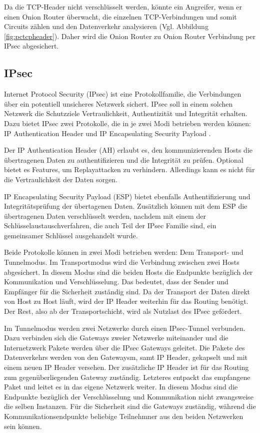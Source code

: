 \documentclass[fleqn,envcountsame,runningheads,10pt,a4paper]{llncs}
\begin{document}
Da die TCP-Header nicht verschlüsselt werden, könnte ein Angreifer, wenn er 
einen Onion Router überwacht, die einzelnen TCP-Ver\-bin\-dung\-en und somit 
Circuits zählen und den Datenverkehr analysieren (Vgl. Abbildung 
\ref{fig:pctcpheader}). Daher wird die Onion Router zu Onion Router Verbindung 
per IPsec abgesichert.

\subsection{IPsec}

Internet Protocol Security (IPsec) ist eine Protokollfamilie, die Verbindungen 
über ein potentiell unsicheres Netzwerk sichert. IPsec soll in einem solchen 
Netzwerk die Schutzziele Vertraulichkeit, Authentizität und Integrität erhalten. 
Dazu bietet IPsec zwei Protokolle, die in je zwei Modi betrieben werden können: 
IP Authentication Header \cite{rfc:ah} und IP Encapsulating Security Payload 
\cite{rfc:esp}.

Der IP Authentication Header (AH) erlaubt es, den kommunizierenden Hosts die 
übertragenen Daten zu authentifizieren und die Integrität zu prüfen. Optional 
bietet es Features, um Replayattacken zu verhindern. Allerdings kann es nicht 
für die Vertraulichkeit der Daten sorgen.

IP Encapsulating Security Payload (ESP) bietet ebenfalls Authentifizierung und 
In\-te\-gri\-täts\-prü\-fung der übertagenen Daten. Zusätzlich können mit dem 
ESP die übertragenen Daten verschlüsselt werden, nachdem mit einem der 
Schlüsselaustauschverfahren, die auch Teil der IPsec Familie sind, ein 
gemeinsamer Schlüssel ausgehandelt wurde. 

Beide Protokolle können in zwei Modi betrieben werden: Dem Transport- und 
Tunnelmodus. Im Transportmodus wird die Verbindung zwischen zwei Hosts 
abgesichert. In diesem Modus sind die beiden Hosts die Endpunkte bezüglich der 
Kommunikation und Verschlüsselung. Das bedeutet, dass der Sender und Empfänger 
für die Sicherheit zuständig sind. Da der Transport der Daten direkt von Host zu 
Host läuft, wird der IP Header weiterhin für das Routing benötigt. Der Rest, 
also ab der Transportschicht, wird als Nutzlast des IPsec gefördert.

Im Tunnelmodus werden zwei Netzwerke durch einen IPsec-Tunnel verbunden. Dazu 
verbinden sich die Gateways zweier Netzwerke miteinander und die Internetzwerk 
Pakete werden über die IPsec Gateways geleitet. Die Pakete des Datenverkehrs 
werden von den Gatewaysm, samt IP Header, gekapselt und mit einem neuen IP 
Header versehen. Der zusätzliche IP Header ist für das Routing zum 
gegenüberliegenden Gateway zuständig. Letzteres entpackt das empfangene Paket 
und leitet es in das eigene Netzwerk weiter. In diesem Modus sind die Endpunkte 
bezüglich der Verschlüsselung und Kommunikation nicht zwangsweise die selben 
Instanzen. Für die Sicherheit sind die Gateways zuständig, während die 
Kommunikationsendpunkte beliebige Teilnehmner aus den beiden Netzwerken sein 
können.
\end{document}
